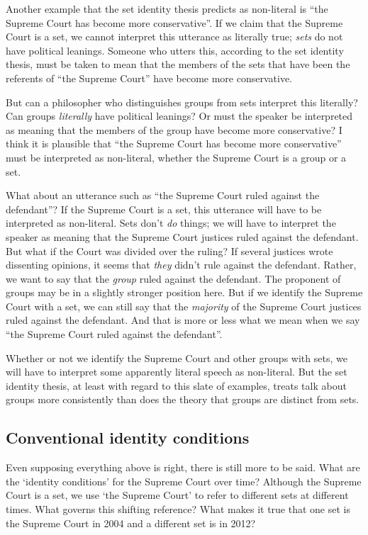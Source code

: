 \documentclass[11pt]{article}
\begin{document}
\begin{spacing}{1.5}
Another example that the set identity thesis predicts as non-literal
is ``the Supreme Court has become more conservative''.  If we claim
that the Supreme Court is a set, we cannot interpret this utterance as
literally true; {\em sets} do not have political leanings.  Someone
who utters this, according to the set identity thesis, must be taken
to mean that the members of the sets that have been the referents of
``the Supreme Court'' have become more conservative.

But can a philosopher who distinguishes groups from sets interpret
this literally?  Can groups {\em literally} have political leanings?
Or must the speaker be interpreted as meaning that the members of the
group have become more conservative?  I think it is plausible that
``the Supreme Court has become more conservative'' must be interpreted
as non-literal, whether the Supreme Court is a group or a set.

What about an utterance such as ``the Supreme Court ruled against the
defendant''?  If the Supreme Court is a set, this utterance will have
to be interpreted as non-literal.  Sets don't {\em do} things; we will
have to interpret the speaker as meaning that the Supreme Court
justices ruled against the defendant.  But what if the Court was
divided over the ruling?  If several justices wrote dissenting
opinions, it seems that {\em they} didn't rule against the defendant.
Rather, we want to say that the {\em group} ruled against the
defendant.  The proponent of groups may be in a slightly stronger
position here.  But if we identify the Supreme Court with a set, we
can still say that the {\em majority} of the Supreme Court justices
ruled against the defendant.  And that is more or less what we mean
when we say ``the Supreme Court ruled against the defendant''.

Whether or not we identify the Supreme Court and other groups with
sets, we will have to interpret some apparently literal speech as
non-literal.  But the set identity thesis, at least with regard to
this slate of examples, treats talk about groups more consistently
than does the theory that groups are distinct from sets.

\subsection{Conventional identity conditions}
\label{set-convention}
Even supposing everything above is right, there is still more to be
said.  What are the `identity conditions' for the Supreme Court over
time?  Although the Supreme Court is a set, we use `the Supreme Court'
to refer to different sets at different times.  What governs this
shifting reference?  What makes it true that one set is the Supreme
Court in 2004 and a different set is in 2012?


\end{spacing}
\end{document}
